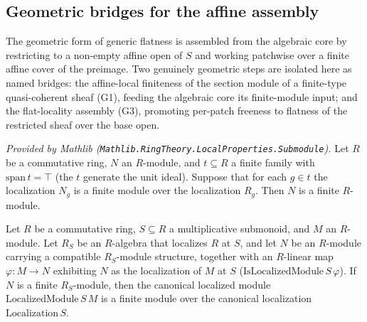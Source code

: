 \subsection{Geometric bridges for the affine assembly}
\label{sec:gf_geometric_bridges}

The geometric form of generic flatness is assembled from the algebraic core by
restricting to a non-empty affine open of \(S\) and working patchwise over a finite
affine cover of the preimage. Two genuinely geometric steps are isolated here as
named bridges: the affine-local finiteness of the section module of a finite-type
quasi-coherent sheaf (G1), feeding the algebraic core its finite-module input; and
the flat-locality assembly (G3), promoting per-patch freeness to flatness of the
restricted sheaf over the base open.

\begin{lemma}
  \label{lem:module_finite_of_localizationSpan}
  \mathlibok
  \textit{Provided by Mathlib (\texttt{Mathlib.RingTheory.LocalProperties.Submodule}).}
  Let \(R\) be a commutative ring, \(N\) an \(R\)-module, and \(t \subseteq R\) a
  finite family with \(\mathrm{span}\,t = \top\) (the \(t\) generate the unit
  ideal). Suppose that for each \(g \in t\) the localization \(N_g\) is a finite
  module over the localization \(R_g\). Then \(N\) is a finite \(R\)-module.
\end{lemma}

\begin{lemma}
  \label{lem:finite_localizedModule_transfer}
  Let \(R\) be a commutative ring, \(S \subseteq R\) a multiplicative submonoid,
  and \(M\) an \(R\)-module. Let \(R_S\) be an \(R\)-algebra that localizes \(R\)
  at \(S\), and let \(N\) be an \(R\)-module carrying a compatible \(R_S\)-module
  structure, together with an \(R\)-linear map \(\varphi : M \to N\) exhibiting
  \(N\) as the localization of \(M\) at \(S\) (\(\mathrm{IsLocalizedModule}\,S\,
  \varphi\)). If \(N\) is a finite \(R_S\)-module, then the canonical localized
  module \(\mathrm{LocalizedModule}\,S\,M\) is a finite module over the canonical
  localization \(\mathrm{Localization}\,S\).
\end{lemma}

